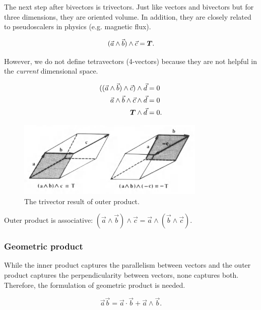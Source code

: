 The next step after bivectors is trivectors. Just like vectors and bivectors but for three dimensions, they are oriented volume. In addition, they are closely related to pseudoscalers in physics (e.g. magnetic flux).

\[
    ( \vec{a} \wedge \vec{b} ) \wedge  \vec{c} = \bm{T}
.\]

However, we do not define tetravectors (4-vectors) because they are not helpful in the \textit{current} dimensional space.

\begin{align*}
    ( ( \vec{a} \wedge \vec{b} ) \wedge  \vec{c} ) \wedge \vec{d} &= 0 \\
    \vec{a} \wedge \vec{b} \wedge  \vec{c} \wedge \vec{d} &= 0 \\
    \bm{T} \wedge \vec{d} &= 0
.\end{align*}

\begin{figure}[htpb]
    \centering
    \includegraphics[width=0.8\textwidth]{figures/trivectors.PNG}
    \caption{The trivector result of outer product.}
    \label{fig:trivetors}
\end{figure}

\begin{note}
    Outer product is associative: $( \vec{a}\wedge \vec{b} )\wedge \vec{c}=\vec{a}\wedge (\vec{b}\wedge \vec{c})$.
\end{note}

\subsubsection{Geometric product}%
\label{ssub:geometric-product}

While the inner product captures the parallelism between vectors and the outer product captures the perpendicularity between vectors, none captures both. Therefore, the formulation of geometric product is needed.

\begin{definition}
    \[
    \vec{a}\vec{b}=\vec{a}\cdot\vec{b} + \vec{a}\wedge\vec{b}
    .\]
\end{definition}

